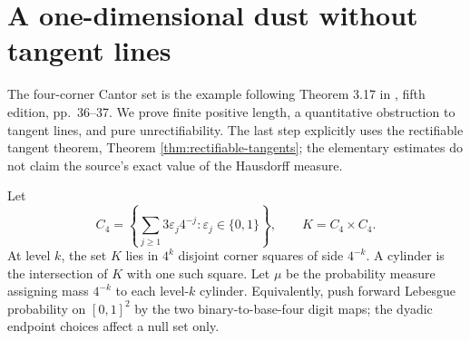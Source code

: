 \chapter{A one-dimensional dust without tangent lines}\label{sec:four-corner-examples}
The four-corner Cantor set is the example following Theorem 3.17 in \cite{Mor16}, fifth edition, pp.~36--37. We prove finite positive length, a quantitative obstruction to tangent lines, and pure unrectifiability. The last step explicitly uses the rectifiable tangent theorem, Theorem \ref{thm:rectifiable-tangents}; the elementary estimates do not claim the source's exact value of the Hausdorff measure.

\begin{definition}\label{def:four-corner-cantor}
Let
\[
 C_4=\left\{\sum_{j\ge1}3\varepsilon_j4^{-j}:\varepsilon_j\in\{0,1\}\right\},\qquad K=C_4\times C_4.
\]
At level $k$, the set $K$ lies in $4^k$ disjoint corner squares of side $4^{-k}$. A cylinder is the intersection of $K$ with one such square. Let $\mu$ be the probability measure assigning mass $4^{-k}$ to each level-$k$ cylinder. Equivalently, push forward Lebesgue probability on $[0,1]^2$ by the two binary-to-base-four digit maps; the dyadic endpoint choices affect a null set only.
\end{definition}

